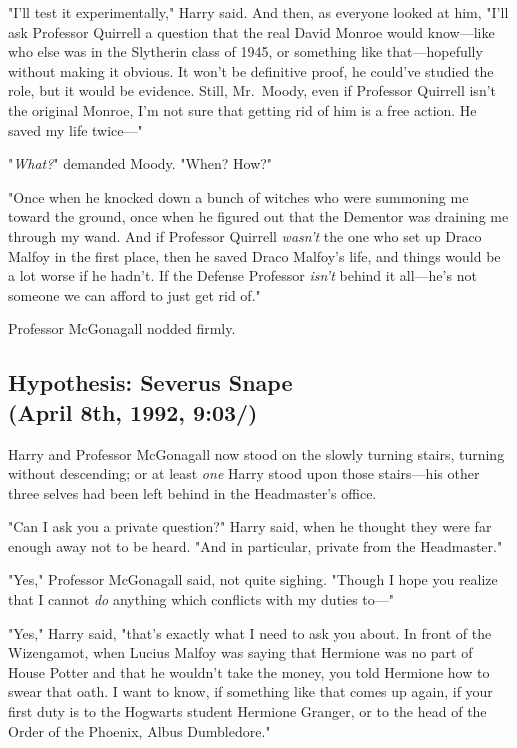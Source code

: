 "I'll test it experimentally," Harry said. And then, as everyone looked at him,
"I'll ask Professor Quirrell a question that the real David Monroe would
know---like who else was in the Slytherin class of 1945, or something like
that---hopefully without making it obvious. It won't be definitive proof, he
could've studied the role, but it would be evidence. Still, Mr.~Moody, even if
Professor Quirrell isn't the original Monroe, I'm not sure that getting rid of
him is a free action. He saved my life twice\mbox{---}"

"\emph{What?}" demanded Moody. "When? How?"

"Once when he knocked down a bunch of witches who were summoning me toward the
ground, once when he figured out that the Dementor was draining me through my
wand. And if Professor Quirrell \emph{wasn't} the one who set up Draco Malfoy
in the first place, then he saved Draco Malfoy's life, and things would be a
lot worse if he hadn't. If the Defense Professor \emph{isn't} behind it
all---he's not someone we can afford to just get rid of."

Professor McGonagall nodded firmly.
\sbreak
\subsection{Hypothesis: Severus Snape\\
(April 8th, 1992, 9:03\PM/)}

Harry and Professor McGonagall now stood on the slowly turning stairs, turning
without descending; or at least \emph{one} Harry stood upon those stairs---his
other three selves had been left behind in the Headmaster's office.

"Can I ask you a private question?" Harry said, when he thought they were far
enough away not to be heard. "And in particular, private from the Headmaster."

"Yes," Professor McGonagall said, not quite sighing. "Though I hope you realize
that I cannot \emph{do} anything which conflicts with my duties to\mbox{---}"

"Yes," Harry said, "that's exactly what I need to ask you about. In front of
the Wizengamot, when Lucius Malfoy was saying that Hermione was no part of
House Potter and that he wouldn't take the money, you told Hermione how to
swear that oath. I want to know, if something like that comes up again, if your
first duty is to the Hogwarts student Hermione Granger, or to the head of the
Order of the Phoenix, Albus Dumbledore."

